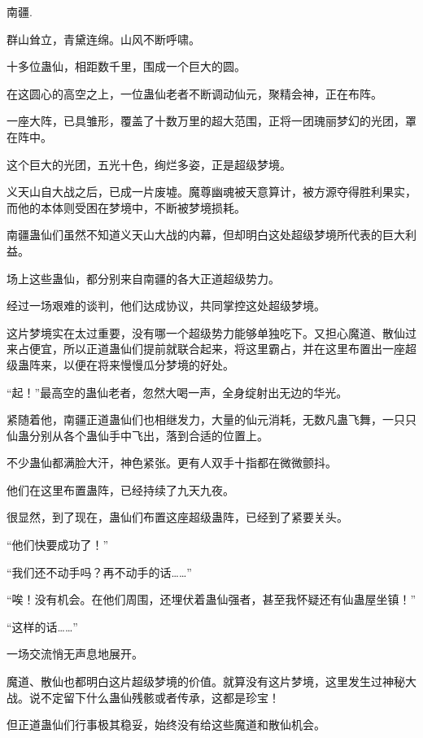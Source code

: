 
\begin{this_body}

南疆.

群山耸立，青黛连绵。山风不断呼啸。

十多位蛊仙，相距数千里，围成一个巨大的圆。

在这圆心的高空之上，一位蛊仙老者不断调动仙元，聚精会神，正在布阵。

一座大阵，已具雏形，覆盖了十数万里的超大范围，正将一团瑰丽梦幻的光团，罩在阵中。

这个巨大的光团，五光十色，绚烂多姿，正是超级梦境。

义天山自大战之后，已成一片废墟。魔尊幽魂被天意算计，被方源夺得胜利果实，而他的本体则受困在梦境中，不断被梦境损耗。

南疆蛊仙们虽然不知道义天山大战的内幕，但却明白这处超级梦境所代表的巨大利益。

场上这些蛊仙，都分别来自南疆的各大正道超级势力。

经过一场艰难的谈判，他们达成协议，共同掌控这处超级梦境。

这片梦境实在太过重要，没有哪一个超级势力能够单独吃下。又担心魔道、散仙过来占便宜，所以正道蛊仙们提前就联合起来，将这里霸占，并在这里布置出一座超级蛊阵来，以便在将来慢慢瓜分梦境的好处。

“起！”最高空的蛊仙老者，忽然大喝一声，全身绽射出无边的华光。

紧随着他，南疆正道蛊仙们也相继发力，大量的仙元消耗，无数凡蛊飞舞，一只只仙蛊分别从各个蛊仙手中飞出，落到合适的位置上。

不少蛊仙都满脸大汗，神色紧张。更有人双手十指都在微微颤抖。

他们在这里布置蛊阵，已经持续了九天九夜。

很显然，到了现在，蛊仙们布置这座超级蛊阵，已经到了紧要关头。

“他们快要成功了！”

“我们还不动手吗？再不动手的话……”

“唉！没有机会。在他们周围，还埋伏着蛊仙强者，甚至我怀疑还有仙蛊屋坐镇！”

“这样的话……”

一场交流悄无声息地展开。

魔道、散仙也都明白这片超级梦境的价值。就算没有这片梦境，这里发生过神秘大战。说不定留下什么蛊仙残骸或者传承，这都是珍宝！

但正道蛊仙们行事极其稳妥，始终没有给这些魔道和散仙机会。


\end{this_body}
